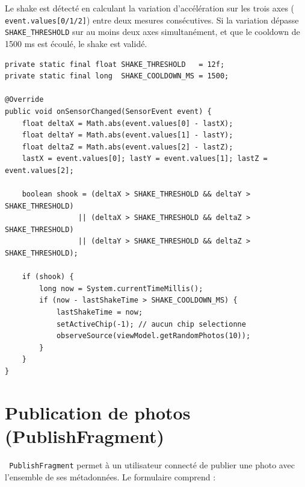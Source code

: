\documentclass[a4paper,12pt,openany]{report}
\newcommand{\ic}[1]{\texttt{\small\colorbox{lightbg}{\color{navy!90} #1}}}
\begin{document}
Le shake est détecté en calculant la variation d'accélération sur les trois axes
(\ic{event.values[0/1/2]}) entre deux mesures consécutives. Si la variation
dépasse \ic{SHAKE\_THRESHOLD} sur au moins deux axes simultanément, et que le
cooldown de 1500 ms est écoulé, le shake est validé.

\begin{lstlisting}
private static final float SHAKE_THRESHOLD   = 12f;
private static final long  SHAKE_COOLDOWN_MS = 1500;

@Override
public void onSensorChanged(SensorEvent event) {
    float deltaX = Math.abs(event.values[0] - lastX);
    float deltaY = Math.abs(event.values[1] - lastY);
    float deltaZ = Math.abs(event.values[2] - lastZ);
    lastX = event.values[0]; lastY = event.values[1]; lastZ = event.values[2];

    boolean shook = (deltaX > SHAKE_THRESHOLD && deltaY > SHAKE_THRESHOLD)
                 || (deltaX > SHAKE_THRESHOLD && deltaZ > SHAKE_THRESHOLD)
                 || (deltaY > SHAKE_THRESHOLD && deltaZ > SHAKE_THRESHOLD);

    if (shook) {
        long now = System.currentTimeMillis();
        if (now - lastShakeTime > SHAKE_COOLDOWN_MS) {
            lastShakeTime = now;
            setActiveChip(-1); // aucun chip selectionne
            observeSource(viewModel.getRandomPhotos(10));
        }
    }
}
\end{lstlisting}

\section{Publication de photos (PublishFragment)}

\ic{PublishFragment} permet à un utilisateur connecté de publier une photo avec
l'ensemble de ses métadonnées. Le formulaire comprend :
\end{document}
